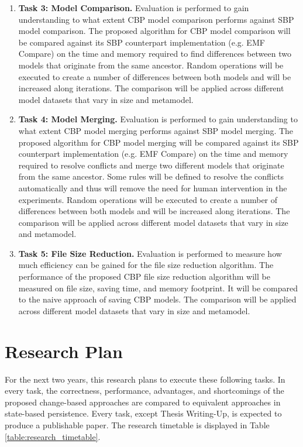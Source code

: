 \documentclass[12pt, a4paper]{report} \usepackage[titletoc]{appendix}
\begin{document}
\begin{enumerate}
    \item \textbf{Task 3: Model Comparison.} Evaluation is performed to gain understanding to what extent CBP model comparison performs against SBP model comparison. The proposed algorithm for CBP model comparison will be compared against its SBP counterpart implementation (e.g. EMF Compare) on the time and memory required to find differences between two models that originate from the same ancestor. Random operations will be executed to create a number of differences between both models and will be increased along iterations. The comparison will be applied across different model datasets that vary in size and metamodel.   
    
    \item \textbf{Task 4: Model Merging.} Evaluation is performed to gain understanding to what extent CBP model merging performs against SBP model merging. The proposed algorithm for CBP model merging will be compared against its SBP counterpart implementation (e.g. EMF Compare) on the time and memory required to resolve conflicts and merge two different models that originate from the same ancestor. Some rules will be defined to resolve the conflicts automatically and thus will remove the need for human intervention in the experiments. Random operations will be executed to create a number of differences between both models and will be increased along iterations. The comparison will be applied across different model datasets that vary in size and metamodel.   
    
    \item \textbf{Task 5: File Size Reduction.} Evaluation is performed to measure how much efficiency can be gained for the file size reduction algorithm. The performance of the proposed CBP file size reduction algorithm will be measured on file size, saving time, and memory footprint. It will be compared to the naive approach of saving CBP models. The comparison will be applied across different model datasets that vary in size and metamodel.   
\end{enumerate}

\chapter{Research Plan}
\label{ch:research_plan}
For the next two years, this research plans to execute these following tasks. In every task, the correctness, performance, advantages, and shortcomings of the proposed change-based approaches are compared to equivalent approaches in state-based persistence. Every task, except Thesis Writing-Up, is expected to produce a publishable paper. The research timetable is displayed in Table \ref{table:research_timetable}.
\end{document}
